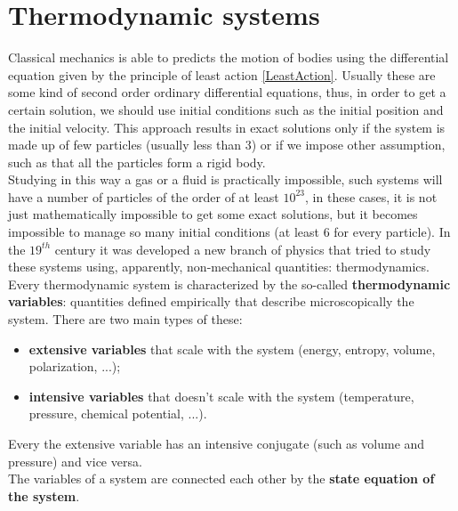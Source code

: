 \section{Thermodynamic systems}
Classical mechanics is able to predicts the motion of bodies using the differential equation given by the principle of least action \ref{LeastAction}. Usually these are some kind of second order ordinary differential equations, thus, in order to get a certain solution, we should use initial conditions such as the initial position and the initial velocity. This approach results in exact solutions only if the system is made up of few particles (usually less than 3) or if we impose other assumption, such as that all the particles form a rigid body.\\
Studying in this way a gas or a fluid is practically impossible, such systems will have a number of particles of the order of at least $10^23$, in these cases, it is not just mathematically impossible to get some exact solutions, but it becomes impossible to manage so many initial conditions (at least 6 for every particle). In the $19^{th}$ century it was developed a new branch of physics that tried to study these systems using, apparently, non-mechanical quantities: thermodynamics.\\

Every thermodynamic system is characterized by the so-called \textbf{thermodynamic variables}: quantities defined empirically that describe microscopically the system. There are two main types of these:
\begin{itemize}
    \item \textbf{extensive variables} that scale with the system (energy, entropy, volume, polarization, ...);
    \item  \textbf{intensive variables} that doesn't scale with the system (temperature, pressure, chemical potential, ...).
\end{itemize}
Every the extensive variable has an intensive conjugate (such as volume and pressure) and vice versa.\\
The variables of a system are connected each other by the \textbf{state equation of the system}.

